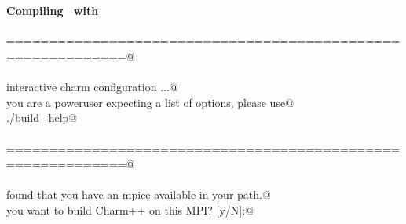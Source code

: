 \begin{frame}[fragile] 
\secframetitle{\ssInstallCharm}
\color{black}
\footnotesize
\prompt             {}  \\
  \\
  \\
  \\
  \\
  \\
\end{frame}



\begin{frame}[fragile] 
\secframetitle{\ssInstallCharm}
\framesubtitle{Compiling \charm\ with }
\color{black}
\footnotesize

\prompt{}
\pause

\verb@============================================================@ \\
\ \\
\verb@Begin interactive charm configuration ...@\\
\verb@If you are a poweruser expecting a list of options, please use@ \\
\verb@   ./build --help@\\
\ \\
\verb@============================================================@ \\
\ \\
\verb@I found that you have an mpicc available in your path.@\\
\verb@Do you want to build Charm++ on this MPI? [y/N]:@ \\

\end{frame}

